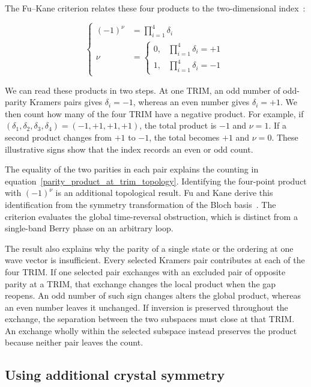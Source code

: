 The Fu--Kane criterion relates these four products to the two-dimensional index~\cite{fu2007topological}:

\begin{equation}
\left\{\begin{aligned}
    (-1)^\nu&=\prod_{i=1}^{4}\delta_i \\
    \nu&=
    \begin{cases}
        0, & \prod_{i=1}^{4}\delta_i=+1 \\
        1, & \prod_{i=1}^{4}\delta_i=-1
    \end{cases}
\end{aligned}\right.
\label{fu_kane_index_topology}
\end{equation}

We can read these products in two steps.
At one TRIM, an odd number of odd-parity Kramers pairs gives $\delta_i=-1$,
whereas an even number gives $\delta_i=+1$.
We then count how many of the four TRIM have a negative product.
For example, if $(\delta_1,\delta_2,\delta_3,\delta_4)=(-1,+1,+1,+1)$,
the total product is $-1$ and $\nu=1$.
If a second product changes from $+1$ to $-1$, the total becomes $+1$ and $\nu=0$.
These illustrative signs show that the index records an even or odd count.

The equality of the two parities in each pair explains the counting in equation~\eqref{parity_product_at_trim_topology}.
Identifying the four-point product with $(-1)^\nu$ is an additional topological result.
Fu and Kane derive this identification from the symmetry transformation of the Bloch basis~\cite[sections II and III]{fu2007topological}.
The criterion evaluates the global time-reversal obstruction,
which is distinct from a single-band Berry phase on an arbitrary loop.

The result also explains why the parity of a single state or the ordering at one wave vector is insufficient.
Every selected Kramers pair contributes at each of the four TRIM.
If one selected pair exchanges with an excluded pair of opposite parity at a TRIM,
that exchange changes the local product when the gap reopens.
An odd number of such sign changes alters the global product,
whereas an even number leaves it unchanged.
If inversion is preserved throughout the exchange, the separation between the two subspaces must close at that TRIM.
An exchange wholly within the selected subspace instead preserves the product because neither pair leaves the count.

\FloatBarrier
\subsection{Using additional crystal symmetry}

